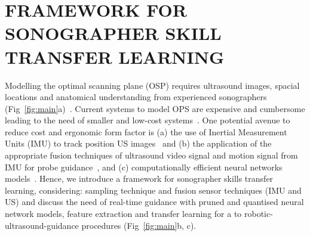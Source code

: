\documentclass[a4paper, 10pt, conference]{ieeeconf}      %
\begin{document}
\section{FRAMEWORK FOR SONOGRAPHER SKILL TRANSFER LEARNING}
Modelling the optimal scanning plane (OSP) requires ultrasound images, spacial locations and anatomical understanding from experienced sonographers (Fig~\ref{fig:main}a)~\cite{deng2021,vonHaxthausen2021}.
Current systems to model OPS are expensive and cumbersome leading to the need of smaller and low-cost systems~\cite{Dressler2021}. 
One potential avenue to reduce cost and ergonomic form factor is (a) the use of Inertial Measurement Units (IMU) to track position US images~\cite{PREVOST2018187}
and (b) the application of the appropriate fusion techniques of ultrasound video signal and motion signal from IMU for probe guidance~\cite{droste2020}, and (c) computationally efficient neural networks models~\cite{deng2021}.
Hence, we introduce a framework for sonographer skills transfer learning, considering: sampling technique and fusion sensor techniques (IMU and US) and discuss the need of real-time guidance with  pruned and quantised neural network models, feature extraction and transfer learning for a to robotic-ultrasound-guidance procedures (Fig~\ref{fig:main}b, c).



\end{document}
